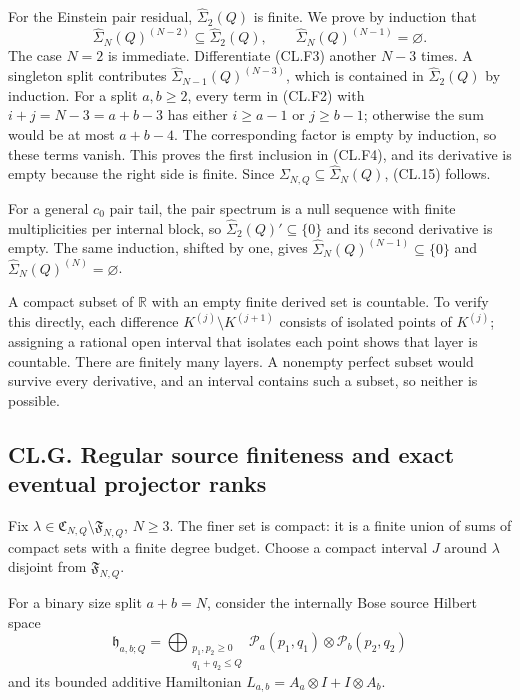 For the Einstein pair residual, \(\widehat\Sigma_2(Q)\) is finite. We prove by induction that \[
\widehat\Sigma_N(Q)^{(N-2)}\subseteq\widehat\Sigma_2(Q),
\qquad
\widehat\Sigma_N(Q)^{(N-1)}=\varnothing.
\tag{CL.F4}
\] The case \(N=2\) is immediate. Differentiate (CL.F3) another \(N-3\) times. A singleton split contributes \(\widehat\Sigma_{N-1}(Q)^{(N-3)}\), which is contained in \(\widehat\Sigma_2(Q)\) by induction. For a split \(a,b\geq2\), every term in (CL.F2) with \(i+j=N-3=a+b-3\) has either \(i\geq a-1\) or \(j\geq b-1\); otherwise the sum would be at most \(a+b-4\). The corresponding factor is empty by induction, so these terms vanish. This proves the first inclusion in (CL.F4), and its derivative is empty because the right side is finite. Since \(\Sigma_{N,Q}\subseteq\widehat\Sigma_N(Q)\), (CL.15) follows.

For a general \(c_0\) pair tail, the pair spectrum is a null sequence with finite multiplicities per internal block, so \(\widehat\Sigma_2(Q)'\subseteq\{0\}\) and its second derivative is empty. The same induction, shifted by one, gives \(\widehat\Sigma_N(Q)^{(N-1)}\subseteq\{0\}\) and \(\widehat\Sigma_N(Q)^{(N)}=\varnothing\).

A compact subset of \(\mathbb R\) with an empty finite derived set is countable. To verify this directly, each difference \(K^{(j)}\setminus K^{(j+1)}\) consists of isolated points of \(K^{(j)}\); assigning a rational open interval that isolates each point shows that layer is countable. There are finitely many layers. A nonempty perfect subset would survive every derivative, and an interval contains such a subset, so neither is possible.

\hypertarget{cl.g.-regular-source-finiteness-and-exact-eventual-projector-ranks}{%
\subsection{CL.G. Regular source finiteness and exact eventual projector ranks}\label{cl.g.-regular-source-finiteness-and-exact-eventual-projector-ranks}}

Fix \(\lambda\in\mathfrak C_{N,Q}\setminus\mathfrak F_{N,Q}\), \(N\geq3\). The finer set is compact: it is a finite union of sums of compact sets with a finite degree budget. Choose a compact interval \(J\) around \(\lambda\) disjoint from \(\mathfrak F_{N,Q}\).

For a binary size split \(a+b=N\), consider the internally Bose source Hilbert space \[
\mathfrak h_{a,b;Q}
=\bigoplus_{\substack{p_1,p_2\geq0\\q_1+q_2\leq Q}}
\mathcal P_a(p_1,q_1)\otimes\mathcal P_b(p_2,q_2)
\] and its bounded additive Hamiltonian \(L_{a,b}=A_a\otimes I+I\otimes A_b\).

